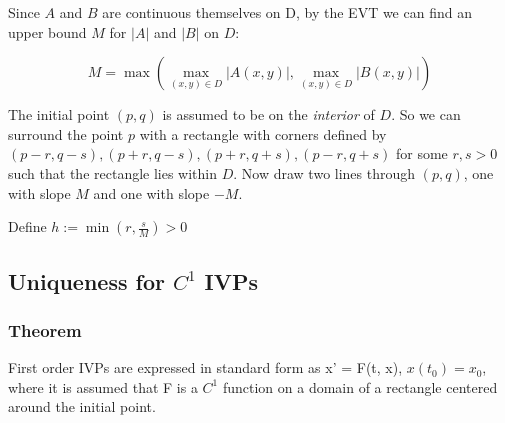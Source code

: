 \documentclass[11 pt, twoside]{article}
\begin{document}

Since $A$ and $B$ are continuous themselves on D, by the EVT we can find an upper bound $M$ for $|A|$ and $|B|$ on $D$:

\[
M = \max(\max_{(x,y) \in D} |A(x, y)|, \max_{(x, y) \in D} |B(x, y)|)
\]

The initial point $(p, q)$ is assumed to be on the \textit{interior} of $D$. So we can surround the point $p$ with a rectangle with corners defined by $(p - r, q - s), (p+r, q - s), (p+r, q+s), (p-r, q+s)$ for some $r, s > 0$ such that the rectangle lies within $D$. Now draw two lines through $(p, q)$, one with slope $M$ and one with slope $-M$.


Define $h := \min(r, \frac{s}{M}) > 0$

\subsection{Uniqueness for $C^1$ IVPs}
\subsubsection{Theorem}
First order IVPs are expressed in standard form as x' = F(t, x), $x(t_0) = x_0$, where it is assumed that F is a $C^1$ function on a domain of a rectangle centered around the initial point.
\end{document}
